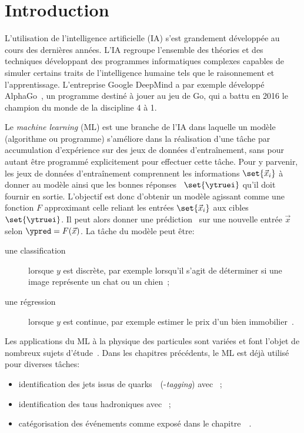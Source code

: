\section{Introduction}\label{chapter-ML-section-intro}
L'utilisation de l'intelligence artificielle (IA) s'est grandement développée au cours des dernières années.
L'IA regroupe l'ensemble des théories et des techniques développant des programmes informatiques complexes capables de simuler certains traits de l'intelligence humaine tels que le raisonnement et l'apprentissage.
L'entreprise Google DeepMind a par exemple développé AlphaGo~\cite{alphago},
un programme destiné à jouer au jeu de Go,
qui a battu en 2016 le champion du monde de la discipline 4 à 1.
\par
Le \emph{machine learning} (ML) est une branche de l'IA
dans laquelle un modèle (algorithme ou programme) s'améliore dans la réalisation d'une tâche par
accumulation d'expérience sur des jeux de données d'entraînement,
sans pour autant être programmé explicitement pour effectuer cette tâche.
Pour y parvenir,
les jeux de données d'entraînement comprennent les informations $\set{\vec{x}_i}$ à donner au modèle
ainsi que les \og bonnes réponses \fg\ $\set{\ytruei}$ qu'il doit fournir en sortie.
L'objectif est donc d'obtenir un modèle agissant comme une fonction $F$ approximant celle reliant les entrées $\set{\vec{x}_i}$ aux cibles $\set{\ytruei}$.
Il peut alors donner une prédiction \ypred\ sur une nouvelle entrée $\vec{x}$ selon $\ypred=F(\vec{x})$.
La tâche du modèle peut être:
\begin{description}
\item[une classification] lorsque $y$ est discrète, par exemple lorsqu'il s'agit de déterminer si une image représente un chat ou un chien~\cite{datafrog_img_reco};
\item[une régression] lorsque $y$ est continue, par exemple estimer le prix d'un bien immobilier~\cite{house_prices_regression}.
\end{description}
\par
Les applications du ML à la physique des particules sont variées et font l'objet de nombreux sujets d'étude~\cite{Gael_thesis,scham_moritz_2020_21993,kopf_tanja_2019_21500,Baldi_2015}.
Dans les chapitres précédents, le ML est déjà utilisé pour diverses tâches:
\begin{itemize}
\item identification des jets issus de quarks~\quarkb\ (\quarkb-\emph{tagging}) avec \DeepCSV~\cite{jet_flavor_deep_nn,Sirunyan_heavy_flavor_jets_2018,DeepJet};
\item identification des taus hadroniques avec \DEEPTAU~\cite{CMS-DP-2019-033};
\item catégorisation des événements comme exposé dans le chapitre~~\cite{CMS-NOTE-2019-177,CMS-NOTE-2019-178}.
\end{itemize}
